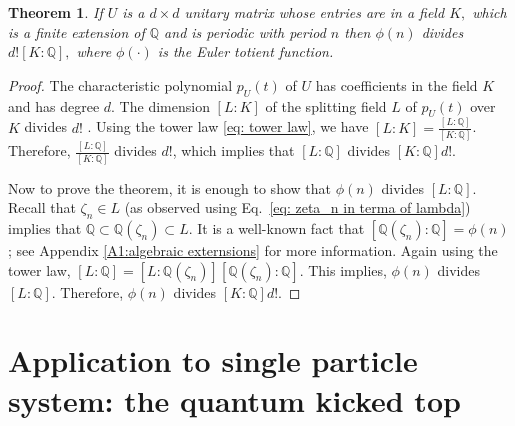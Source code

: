 \documentclass[a4paper,onecolumn,accepted=2026-04-08,10pt]{quantumarticle}
\newtheorem{theorem}{Theorem}[section]
\theoremstyle{definition}
\begin{document}
\begin{theorem}\label{Theorem 1}
    If $U$ is a $d \times d$ unitary matrix whose entries are in a field $K,$ which is a finite extension of $\mathbb{Q}$ and is periodic with period $n$ then $\phi(n)$ divides $d![K:\mathbb{Q}],$ where $\phi(\cdot)$ is the Euler totient function.
\end{theorem}
\begin{proof}\label{proof:Theorem 1}
    The characteristic polynomial $p_{U}(t)$ of $U$ has coefficients in the field $K$ and has degree $d$.  
    The dimension $[L:K]$ of the splitting field $L$ of $p_{U}(t)$ over $K$ divides $d!$ \cite{dummit_foote_abstract_2003}. Using the tower law \eqref{eq: tower law}, we have $[L:K] = \frac{[L:\mathbb{Q}]}{[K:\mathbb{Q}]}$. Therefore, $\frac{[L:\mathbb{Q}]}{[K:\mathbb{Q}]}$ divides $d!$, which implies that $[L:\mathbb{Q}]$ divides $[K:\mathbb{Q}]d!.$ 
    
    Now to prove the theorem, it is enough to show that $\phi(n)$ divides $[L:\mathbb{Q}]$. Recall that $\zeta_n \in L$ (as observed using Eq.\ \eqref{eq: zeta_n in terma of lambda}) implies that  $\mathbb{Q} \subset \mathbb{Q}(\zeta_n) \subset L$. It is a well-known fact that $[\mathbb{Q}(\zeta_n):\mathbb{Q}] = \phi(n)$; see Appendix \ref{A1:algebraic externsions} for more information. Again using the tower law, $[L:\mathbb{Q}] = [L:\mathbb{Q}(\zeta_n)][\mathbb{Q}(\zeta_n):\mathbb{Q}]$. This implies, $\phi(n)$ divides $[L:\mathbb{Q}]$. Therefore, $\phi(n)$ divides $[K:\mathbb{Q}]d!.$ 
\end{proof}


\section{Application to single particle system: the quantum kicked top}\label{sec: QKT}
\end{document}

